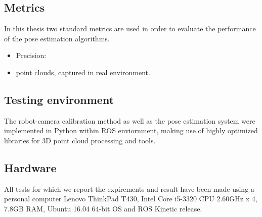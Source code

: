 \subsection{Metrics}
In this thesis two standard metrics are used in order to evaluate the performance of the pose estimation algorithms.
\begin{itemize}
\item Precision:
\item point clouds, captured in real environment. 
\end{itemize}

\subsection{Testing environment}
The robot-camera calibration method as well as the pose estimation system were implemented in Python within ROS enviornment, making use of highly optimized libraries for 3D point cloud processing and tools. 

\subsection{Hardware}
All tests for which we report the expirements and result have been made using a personal computer Lenovo ThinkPad T430, Intel Core i5-3320 CPU 2.60GHz x 4, 7.8GB RAM, Ubuntu 16.04 64-bit OS
and ROS Kinetic release.

\fi
